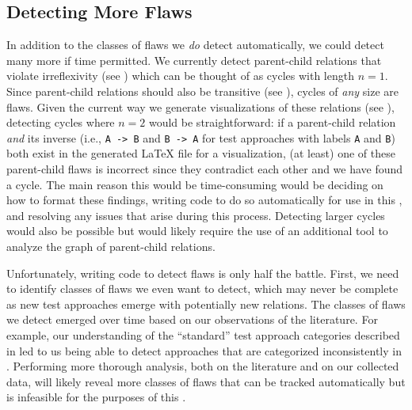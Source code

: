 \subsection{Detecting More Flaws}\label{future-detect-flaws}
In addition to the classes of flaws we \emph{do} detect automatically, we could
detect many more if time permitted. We currently detect parent-child relations
that violate irreflexivity (see ) which can be thought of as
cycles with length $n=1$. Since parent-child relations should also be
transitive (see ), cycles of \emph{any} size are flaws.
Given the current way we generate visualizations of these relations (see
), detecting cycles where $n=2$ would be straightforward: if
a parent-child relation \emph{and} its inverse (i.e., \texttt{A~->~B} and
\texttt{B~->~A} for test approaches with labels \texttt{A} and \texttt{B}) both
exist in the generated \LaTeX{} file for a visualization, (at least) one of
these parent-child flaws is incorrect since they contradict each other and we
have found a cycle. The main reason this would be time-consuming would be
deciding on how to format these findings, writing code to do so automatically
for use in this \docType{}, and resolving any issues that arise during this
process. Detecting larger cycles would also be possible but would likely
require the use of an additional tool to analyze the graph of parent-child
relations.

Unfortunately, writing code to detect flaws is only half the battle. First, we
need to identify classes of flaws we even want to detect, which may never be
complete as new test approaches emerge with potentially new relations. The
classes of flaws we detect emerged over time based on our observations of the
literature. For example, our understanding of the ``standard'' test approach
categories described in  led to us being able to detect
approaches that are categorized inconsistently in .
Performing more thorough analysis, both on the literature and on our collected
data, will likely reveal more classes of flaws that can be tracked
automatically but is infeasible for the purposes of this \docType{}.
